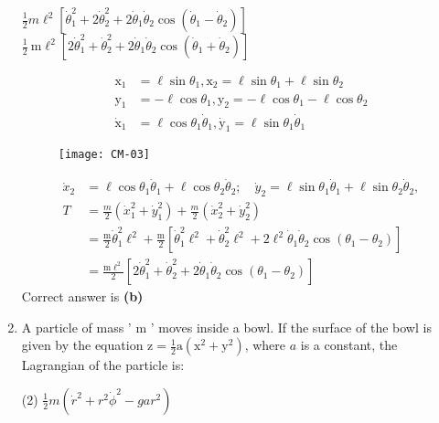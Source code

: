 \begin{enumerate}
\begin{tasks}
		\task[\textbf{c.}]$\frac{1}{2} m \ell^{2}\left[\dot{\theta}_{1}^{2}+2 \dot{\theta}_{2}^{2}+2 \dot{\theta}_{1} \dot{\theta}_{2} \cos \left(\dot{\theta}_{1}-\dot{\theta}_{2}\right)\right]$
		\task[\textbf{d.}] $\frac{1}{2} \mathrm{~m} \ell^{2}\left[2 \dot{\theta}_{1}^{2}+\dot{\theta}_{2}^{2}+2 \dot{\theta}_{1} \dot{\theta}_{2} \cos \left(\dot{\theta}_{1}+\dot{\theta}_{2}\right)\right]$
	\end{tasks}
	\begin{answer}
		\begin{align*}
	\mathrm{x}_{1}&=\ell \sin \theta_{1},  \mathrm{x}_{2}=\ell \sin \theta_{1}+\ell \sin \theta_{2} \\ \mathrm{y}_{1}&=-\ell \cos \theta_{1},  \mathrm{y}_{2}=-\ell \cos \theta_{1}-\ell \cos \theta_{2} \\ \dot{\mathrm{x}}_{1}&=\ell \cos \theta_{1} \dot{\theta}_{1},  \dot{\mathrm{y}}_{1}=\ell \sin \theta_{1} \dot{\theta}_{1}
		\end{align*}
		\begin{figure}[H]
			\centering
			\texttt{[image: CM-03]}
		\end{figure}
		\begin{align*}
		\dot{x}_{2}&=\ell \cos \theta_{1} \dot{\theta}_{1}+\ell \cos \theta_{2} \dot{\theta}_{2} ; \quad \dot{y}_{2}=\ell \sin \theta_{1} \dot{\theta}_{1}+\ell \sin \theta_{2} \dot{\theta}_{2},\\
		T&=\frac{m}{2}\left(\dot{x}_{1}^{2}+\dot{y}_{1}^{2}\right)+\frac{m}{2}\left(\dot{x}_{2}^{2}+\dot{y}_{2}^{2}\right)\\
		&=\frac{\mathrm{m}}{2} \dot{\theta}_{1}^{2} \ell^{2}+\frac{\mathrm{m}}{2}\left[\dot{\theta}_{1}^{2} \ell^{2}+\dot{\theta}_{2}^{2} \ell^{2}+2 \ell^{2} \dot{\theta}_{1} \dot{\theta}_{2} \cos \left(\theta_{1}-\theta_{2}\right)\right]\\
		&=\frac{\mathrm{m} \ell^{2}}{2}\left[2 \dot{\theta}_{1}^{2}+\dot{\theta}_{2}^{2}+2 \dot{\theta}_{1} \dot{\theta}_{2} \cos \left(\theta_{1}-\theta_{2}\right)\right]
		\end{align*}
		Correct answer is \textbf{(b)}
	\end{answer}
	\item A particle of mass ' $\mathrm{m}$ ' moves inside a bowl. If the surface of the bowl is given by the equation $\mathrm{z}=\frac{1}{2} \mathrm{a}\left(\mathrm{x}^{2}+\mathrm{y}^{2}\right)$, where $a$ is a constant, the Lagrangian of the particle is:
	 \begin{tasks}(2)
		\task[\textbf{a.}] $\frac{1}{2} m\left(\dot{r}^{2}+r^{2} \dot{\phi}^{2}-g a r^{2}\right)$

\end{tasks}
\end{enumerate}
